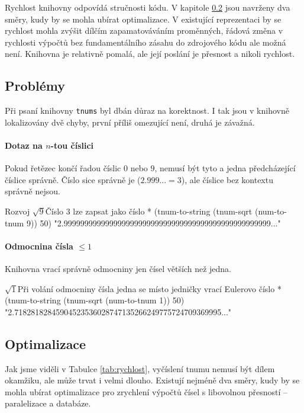 Rychlost knihovny odpovídá stručnosti kódu. V kapitole \ref{ssec:optimalizace} jsou navrženy dva směry, kudy by se mohla ubírat optimalizace. V existující reprezentaci 	by se rychlost mohla zvýšit dílčím zapamatováváním proměnných, řádová změna v rychlosti výpočtů bez fundamentálního zásahu do zdrojového kódu ale možná není. Knihovna je relativně pomalá, ale její poslání je přesnost a nikoli rychlost.

\subsection{Problémy}
Při psaní knihovny \texttt{tnums} byl dbán důraz na korektnost. I tak jsou v knihovně lokalizovány dvě chyby, první příliš omezující není, druhá je závažná.

\paragraph{Dotaz na $n$-tou číslici} Pokud řetězec končí řadou číslic $0$ nebo $9$, nemusí být tyto a jedna předcházející číslice správně. Číslo sice správně je ($2.999...=3$), ale číslice bez kontextu správně nejsou.
\begin{lisptest}{Rozvoj $\sqrt{9}$}{Číslo 3 lze zapsat jako číslo \uv{$2.999\ldots$}}
* (tnum-to-string (tnum-sqrt (num-to-tnum 9)) 50)
"2.99999999999999999999999999999999999999999999999999..."
\end{lisptest}

\paragraph{Odmocnina čísla $\leq 1$}
Knihovna vrací správně odmocniny jen čísel větších než jedna.
\begin{lisptest}{$\sqrt{1}$}{Při volání odmocniny čísla jedna se místo jedničky vrací Eulerovo číslo}
* (tnum-to-string (tnum-sqrt (num-to-tnum 1)) 50)
"2.71828182845904523536028747135266249775724709369995..."
\end{lisptest}

\subsection{Optimalizace}\label{ssec:optimalizace}
Jak jsme viděli v Tabulce \ref{tab:rychlost}, vyčíslení tnumu nemusí být dílem okamžiku, ale může trvat i velmi dlouho. Existují nejméně dva směry, kudy by se mohla ubírat optimalizace pro zrychlení výpočtů čísel s libovolnou přesností -- paralelizace a databáze.

